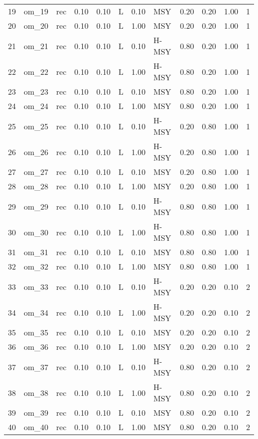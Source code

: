 \begin{table}[ht]
\begin{tabular}{rllrrlrlrrrr}
  19 & om\_19 & rec & 0.10 & 0.10 & L & 0.10 & MSY & 0.20 & 0.20 & 1.00 &   1 \\ 
  20 & om\_20 & rec & 0.10 & 0.10 & L & 1.00 & MSY & 0.20 & 0.20 & 1.00 &   1 \\ 
  21 & om\_21 & rec & 0.10 & 0.10 & L & 0.10 & H-MSY & 0.80 & 0.20 & 1.00 &   1 \\ 
  22 & om\_22 & rec & 0.10 & 0.10 & L & 1.00 & H-MSY & 0.80 & 0.20 & 1.00 &   1 \\ 
  23 & om\_23 & rec & 0.10 & 0.10 & L & 0.10 & MSY & 0.80 & 0.20 & 1.00 &   1 \\ 
  24 & om\_24 & rec & 0.10 & 0.10 & L & 1.00 & MSY & 0.80 & 0.20 & 1.00 &   1 \\ 
  25 & om\_25 & rec & 0.10 & 0.10 & L & 0.10 & H-MSY & 0.20 & 0.80 & 1.00 &   1 \\ 
  26 & om\_26 & rec & 0.10 & 0.10 & L & 1.00 & H-MSY & 0.20 & 0.80 & 1.00 &   1 \\ 
  27 & om\_27 & rec & 0.10 & 0.10 & L & 0.10 & MSY & 0.20 & 0.80 & 1.00 &   1 \\ 
  28 & om\_28 & rec & 0.10 & 0.10 & L & 1.00 & MSY & 0.20 & 0.80 & 1.00 &   1 \\ 
  29 & om\_29 & rec & 0.10 & 0.10 & L & 0.10 & H-MSY & 0.80 & 0.80 & 1.00 &   1 \\ 
  30 & om\_30 & rec & 0.10 & 0.10 & L & 1.00 & H-MSY & 0.80 & 0.80 & 1.00 &   1 \\ 
  31 & om\_31 & rec & 0.10 & 0.10 & L & 0.10 & MSY & 0.80 & 0.80 & 1.00 &   1 \\ 
  32 & om\_32 & rec & 0.10 & 0.10 & L & 1.00 & MSY & 0.80 & 0.80 & 1.00 &   1 \\ 
  33 & om\_33 & rec & 0.10 & 0.10 & L & 0.10 & H-MSY & 0.20 & 0.20 & 0.10 &   2 \\ 
  34 & om\_34 & rec & 0.10 & 0.10 & L & 1.00 & H-MSY & 0.20 & 0.20 & 0.10 &   2 \\ 
  35 & om\_35 & rec & 0.10 & 0.10 & L & 0.10 & MSY & 0.20 & 0.20 & 0.10 &   2 \\ 
  36 & om\_36 & rec & 0.10 & 0.10 & L & 1.00 & MSY & 0.20 & 0.20 & 0.10 &   2 \\ 
  37 & om\_37 & rec & 0.10 & 0.10 & L & 0.10 & H-MSY & 0.80 & 0.20 & 0.10 &   2 \\ 
  38 & om\_38 & rec & 0.10 & 0.10 & L & 1.00 & H-MSY & 0.80 & 0.20 & 0.10 &   2 \\ 
  39 & om\_39 & rec & 0.10 & 0.10 & L & 0.10 & MSY & 0.80 & 0.20 & 0.10 &   2 \\ 
  40 & om\_40 & rec & 0.10 & 0.10 & L & 1.00 & MSY & 0.80 & 0.20 & 0.10 &   2 \\ 

\end{tabular}
\end{table}
